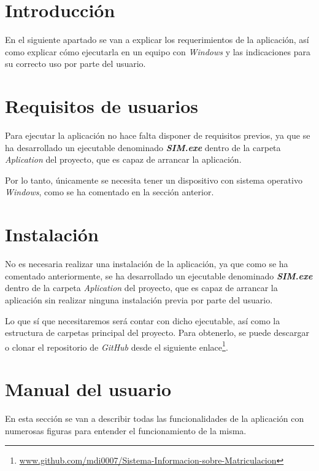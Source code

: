 
\section{Introducción}
En el siguiente apartado se van a explicar los requerimientos de la aplicación, así como explicar cómo ejecutarla en un equipo con \emph{Windows} y las indicaciones para su correcto uso por parte del usuario.

\section{Requisitos de usuarios}

Para ejecutar la aplicación no hace falta disponer de requisitos previos, ya que se ha desarrollado un ejecutable denominado \textbf{\emph{SIM.exe}} dentro de la carpeta \emph{Aplication} del proyecto, que es capaz de arrancar la aplicación.

Por lo tanto, únicamente se necesita tener un dispositivo con sistema operativo \emph{Windows}, como se ha comentado en la sección anterior.



\section{Instalación}

No es necesaria realizar una instalación de la aplicación, ya que como se ha comentado anteriormente, se ha desarrollado un ejecutable denominado \textbf{\emph{SIM.exe}} dentro de la carpeta \emph{Aplication} del proyecto, que es capaz de arrancar la aplicación sin realizar ninguna instalación previa por parte del usuario.

Lo que sí que necesitaremos será contar con dicho ejecutable, así como la estructura de carpetas principal del proyecto.
Para obtenerlo, se puede descargar o clonar el repositorio de \emph{GitHub} desde el siguiente enlace\footnote{\href {https://github.com/mdi0007/Sistema-Informacion-sobre-Matriculacion}{www.github.com/mdi0007/Sistema-Informacion-sobre-Matriculacion}}. 


\section{Manual del usuario}

En esta sección se van a describir todas las funcionalidades de la aplicación con numerosas figuras para entender el funcionamiento de la misma.

